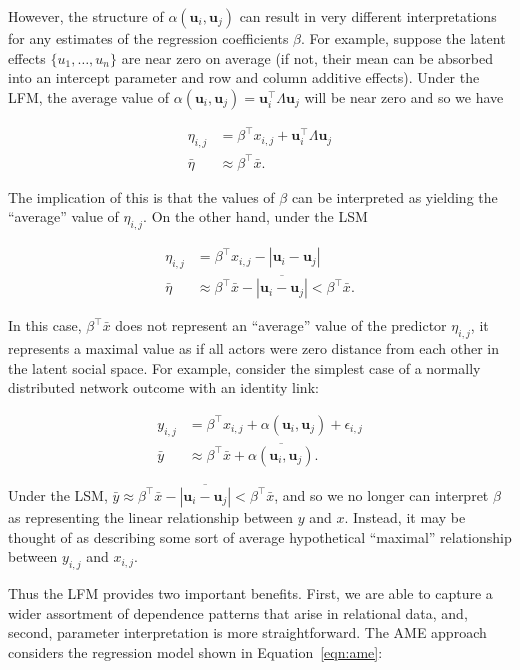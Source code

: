 \documentclass[12pt,pdflatex]{elsarticle}
\begin{document}
However, the structure of $\alpha(\textbf{u}_{i}, \textbf{u}_{j})$ can result in very different interpretations for any estimates of the regression coefficients $\beta$. For example, suppose the latent effects $\{ u_1,\ldots, u_n\}$ are near zero on average (if not, their mean can be absorbed into an intercept parameter and row and column additive effects). Under the LFM, the average value of $\alpha(\textbf{u}_{i}, \textbf{u}_{j}) = \textbf{u}_{i}^{\top} \Lambda \textbf{u}_{j}$ will be near zero and so we have

\begin{align*}
	\eta_{i,j} & =  \beta^\top x_{i,j} + \textbf{u}_{i}^{\top} \Lambda \textbf{u}_{j} \\
	\bar \eta & \approx  \beta^\top \bar x.
\end{align*}

The implication of this is that the values of $\beta$ can be interpreted as yielding the ``average'' value of $\eta_{i,j}$. On the other hand, under the LSM

\begin{align*}
	\eta_{i,j} & =  \beta^\top x_{i,j} - |\textbf{u}_{i} - \textbf{u}_{j}|  \\
	\bar \eta & \approx  \beta^\top \bar x - \overline{ |\textbf{u}_{i} - \textbf{u}_{j}| } <  \beta^\top \bar x .
\end{align*}

In this case, $\beta^\top \bar x$ does not represent an ``average'' value of the predictor $\eta_{i,j}$, it represents a maximal value as if all actors were zero distance from each other in the latent social space. For example, consider the simplest case of a normally distributed network  outcome with an identity link:

\begin{align*}
	y_{i,j} & = \beta^\top x_{i,j} + \alpha(\textbf{u}_{i}, \textbf{u}_{j}) + \epsilon_{i,j} \\
	\bar y & \approx \beta^\top \bar x + \overline{ \alpha(\textbf{u}_{i}, \textbf{u}_{j}) }   .
\end{align*}

Under the LSM, $\bar y \approx \beta^\top \bar x - \overline{ |\textbf{u}_{i} - \textbf{u}_{j}|  } < \beta^\top \bar x$, and so we no longer can interpret $\beta$ as representing the linear relationship between $y$ and $x$. Instead, it may be thought of as describing some sort of average hypothetical ``maximal'' relationship between $y_{i,j}$ and $x_{i,j}$.

Thus the LFM provides two important benefits. First, we are able to capture a wider assortment of dependence patterns that arise in relational data, and, second, parameter interpretation is more straightforward. The AME approach considers the regression model shown in Equation~\ref{eqn:ame}:
\end{document}
